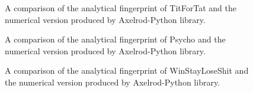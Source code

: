 \begin{figure}[htbp!]
\caption{A comparison of the analytical fingerprint of TitForTat and the numerical version produced by Axelrod-Python library.}
\label{fig:TFT-comparison}
\end{figure}
\begin{figure}[htbp!]
\caption{A comparison of the analytical fingerprint of Psycho and the numerical version produced by Axelrod-Python library.}
\label{fig:Psycho-comparison}
\end{figure}
\begin{figure}[htbp!]
\caption{A comparison of the analytical fingerprint of WinStayLoseShit and the numerical version produced by Axelrod-Python library.}
\label{fig:WSLS-comparison}
\end{figure}
